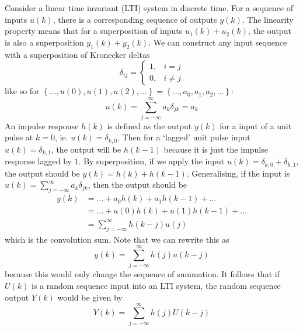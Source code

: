 \documentclass[11pt]{report} %
\begin{document}
Consider a linear time invariant (LTI) system in discrete time. For a sequence of inputs $u\left(k\right)$, there is a corresponding sequence of outputs $y\left(k\right)$. The linearity property means that for a superposition of inputs $u_{1}\left(k\right) + u_{2}\left(k\right)$, the output is also a superposition $y_{1}\left(k\right) + y_{2}\left(k\right)$. We can construct any input sequence with a superposition of Kronecker deltas
\begin{equation}
\delta_{ij} = \begin{cases} 1, & i = j \\ 0, & i\neq j\end{cases}
\end{equation}
like so for $\left\{\dots, u\left(0\right), u\left(1\right), u\left(2\right), \dots\right\} =  \left\{\dots, a_{0}, a_{1}, a_{2}, \dots\right\}$:
\begin{equation}
u\left(k\right) = \sum_{j = -\infty}^{\infty}a_{k}\delta_{jk} = a_{k}
\end{equation}
An impulse response $h\left(k\right)$ is defined as the output $y\left(k\right)$ for a input of a unit pulse at $k = 0$, ie. $u\left(k\right) = \delta_{k,0}$. Then for a `lagged' unit pulse input $u\left(k\right) = \delta_{k,1}$, the output will be $h\left(k - 1\right)$ because it is just the  impulse response lagged by $1$. By superposition, if we apply the input $u\left(k\right) = \delta_{k,0} + \delta_{k,1}$, the output should be $y\left(k\right) = h\left(k\right) + h\left(k - 1\right)$. Generalising, if the input is $u\left(k\right) = \sum_{j = -\infty}^{\infty}a_{k}\delta_{jk}$, then the output should be
\begin{align}
y\left(k\right) &= \dots + a_{0}h\left(k\right) + a_{1}h\left(k - 1\right) + \dots \\
&= \dots + u\left(0\right)h\left(k\right) + u\left(1\right)h\left(k - 1\right) + \dots \\
&= \sum_{j = -\infty}^{\infty}h\left(k - j\right)u\left(j\right)
\end{align}
which is the convolution sum. Note that we can rewrite this as
\begin{equation}
y\left(k\right) = \sum_{j = -\infty}^{\infty}h\left(j\right)u\left(k - j\right)
\end{equation}
because this would only change the sequence of summation. It follows that if $U\left(k\right)$ is a random sequence input into an LTI system, the random sequence output $Y\left(k\right)$ would be given by
\begin{equation}
Y\left(k\right) = \sum_{j = -\infty}^{\infty}h\left(j\right)U\left(k - j\right)
\end{equation}
\end{document}
